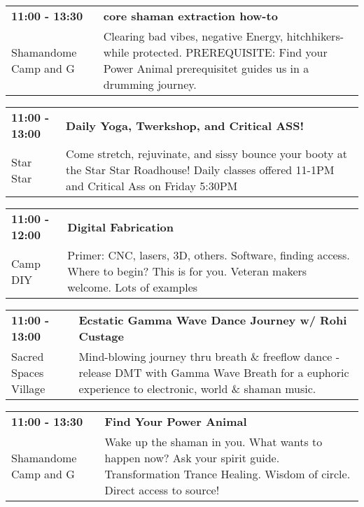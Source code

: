 \begin{tabular}{ p{1in} p{2.2in} }
    \textbf{11:00 - 13:30} & \textbf{core shaman extraction how-to} \\
    Shamandome Camp \newline 615 and G & Clearing bad vibes, negative Energy, hitchhikers- while protected. PREREQUISITE: Find your Power Animal prerequisitet guides us in a drumming journey. \\
    \hline 
\end{tabular}
    
\begin{tabular}{ p{1in} p{2.2in} }
    \textbf{11:00 - 13:00} & \textbf{Daily Yoga, Twerkshop, and Critical ASS!} \\
    Star Star \newline  & Come stretch, rejuvinate, and sissy bounce your booty at the Star Star Roadhouse! Daily classes offered 11-1PM and Critical Ass on Friday 5:30PM \\
    \hline 
\end{tabular}
    
\begin{tabular}{ p{1in} p{2.2in} }
    \textbf{11:00 - 12:00} & \textbf{Digital Fabrication} \\
    Camp DIY \newline  & Primer: CNC, lasers, 3D, others. Software, finding access. Where to begin? This is for you. Veteran makers welcome. Lots of examples \\
    \hline 
\end{tabular}
    
\begin{tabular}{ p{1in} p{2.2in} }
    \textbf{11:00 - 13:00} & \textbf{ Ecstatic Gamma Wave Dance Journey w/ Rohi Custage} \\
    Sacred Spaces Village \newline  & Mind-blowing journey thru breath \& freeflow dance -release DMT with Gamma Wave Breath for a euphoric experience to electronic, world \& shaman music. \\
    \hline 
\end{tabular}
    
\begin{tabular}{ p{1in} p{2.2in} }
    \textbf{11:00 - 13:30} & \textbf{Find Your Power Animal} \\
    Shamandome Camp \newline 615 and G & Wake up the shaman in you. What wants to happen now? Ask your spirit guide. Transformation Trance Healing. Wisdom of circle. Direct access to source! \\
    \hline 
\end{tabular}
    
